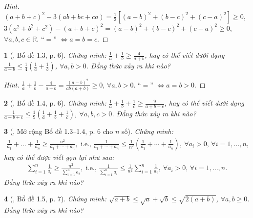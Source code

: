 \documentclass{article}
\newtheorem{baitoan}{}
\begin{document}
\begin{proof}[Hint]
	$(a + b + c)^2 - 3(ab + bc + ca) = \frac{1}{2}\left[(a - b)^2 + (b - c)^2 + (c - a)^2\right]\ge 0$, $3(a^2 + b^2 + c^2) - (a + b + c)^2 = (a - b)^2 + (b - c)^2 + (c - a)^2\ge 0$, $\forall a,b,c\in\mathbb{R}$. ``$=$'' $\Leftrightarrow a = b = c$.
\end{proof}

\begin{baitoan}[\cite{Son_Nghiep_Trung_Can2021}, Bổ đề 1.3, p. 6]
	Chứng minh: $\frac{1}{a} + \frac{1}{b}\ge\frac{4}{a + b}$, hay có thể viết dưới dạng $\frac{1}{a + b}\le\frac{1}{4}\left(\frac{1}{a} + \frac{1}{b}\right)$, $\forall a,b > 0$. Đẳng thức xảy ra khi nào?
\end{baitoan}

\begin{proof}[Hint]
	$\frac{1}{a} + \frac{1}{b} - \frac{4}{a + b} = \frac{(a - b)^2}{ab(a + b)}\ge 0$, $\forall a,b > 0$. ``$=$'' $\Leftrightarrow a = b > 0$.
\end{proof}

\begin{baitoan}[\cite{Son_Nghiep_Trung_Can2021}, Bổ đề 1.4, p. 6]
	Chứng minh: $\frac{1}{a} + \frac{1}{b} + \frac{1}{c}\ge\frac{9}{a + b + c}$, hay có thể viết dưới dạng $\frac{1}{a + b + c}\le\frac{1}{9}\left(\frac{1}{a} + \frac{1}{b} + \frac{1}{c}\right)$, $\forall a,b,c > 0$. Đẳng thức xảy ra khi nào?
\end{baitoan}

\begin{baitoan}[\cite{Son_Nghiep_Trung_Can2021}, Mở rộng Bổ đề 1.3--1.4, p. 6 cho $n$ số]
	Chứng minh:
	\begin{align*}
		\frac{1}{a_1} + \ldots + \frac{1}{a_n}\ge\frac{n^2}{a_1 + \cdots + a_n},\mbox{ i.e., }\frac{1}{a_1 + \cdots + a_n}\le\frac{1}{n^2}\left(\frac{1}{a_1} + \cdots + \frac{1}{a_n}\right),\ \forall a_i > 0,\,\forall i = 1,\ldots,n,
	\end{align*}
	hay có thể được viết gọn lại như sau:
	\begin{align*}
		\sum_{i=1}^{n} \frac{1}{a_i}\ge\frac{n^2}{\sum_{i=1}^n a_i},\mbox{ i.e., }\frac{1}{\sum_{i=1}^n a_i}\le\frac{1}{n^2}\sum_{i=1}^n \frac{1}{a_i},\ \forall a_i > 0,\,\forall i = 1,\ldots,n.
	\end{align*}
	Đẳng thức xảy ra khi nào?
\end{baitoan}

\begin{baitoan}[\cite{Son_Nghiep_Trung_Can2021}, Bổ đề 1.5, p. 7]
	Chứng minh: $\sqrt{a + b}\le\sqrt{a} + \sqrt{b}\le\sqrt{2(a + b)}$, $\forall a,b\ge 0$. Đẳng thức xảy ra khi nào?
\end{baitoan}
\end{document}
